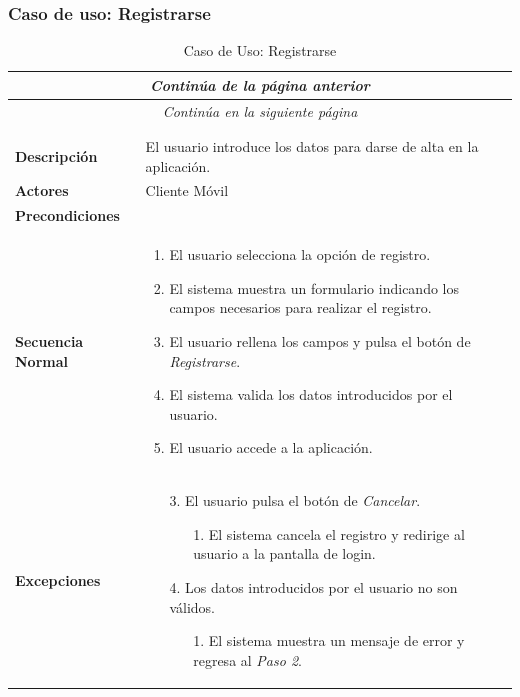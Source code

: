 \newpage
\subsubsection*{Caso de uso: Registrarse}
\begin{longtable}{| p{4cm} | p{10cm} |}
\endfirsthead
\multicolumn{2}{c}{\textit{Continúa de la página anterior}}\\[12pt]
\hline
\endhead
\hline
\multicolumn{2}{c}{\textit{Continúa en la siguiente página}} \\
\endfoot
\hline
\caption{Caso de Uso: Registrarse}\label{fig:1}\\
\endlastfoot


\hline
\multicolumn{2}{|c|}{\textbf{CU$<$02$>$ - Registrarse}} \\

\hline
\textbf{Descripción} &
El usuario introduce los datos para darse de alta en la aplicación. \\

\hline
\textbf{Actores} &
Cliente Móvil\\


\hline
\textbf{Precondiciones} &
\\

\hline
\textbf{Secuencia Normal} &\mbox{}\par\vspace{-\baselineskip}
\begin{enumerate}[leftmargin=0.7cm, topsep=0.1cm]
\item El usuario selecciona la opción de registro.
\item El sistema muestra un formulario indicando los campos necesarios para realizar el registro.
\item El usuario rellena los campos y pulsa el botón de \textit{Registrarse}.
\item El sistema valida los datos introducidos por el usuario.
\item El usuario accede a la aplicación.
\end{enumerate}\\

\hline
\textbf{Excepciones} &\mbox{}\par\vspace{-\baselineskip}
\begin{enumerate}[leftmargin=0.9cm, topsep=0.1cm]
\item[3.] El usuario pulsa el botón de \textit{Cancelar}.
	\begin{itemize}
	\item[1.] El sistema cancela el registro y redirige al usuario a la pantalla de login.
	\end{itemize}
\item[4.] Los datos introducidos por el usuario no son válidos.
	\begin{itemize}
	\item[1.] El sistema muestra un mensaje de error y regresa al \textit{Paso 2}.
	\end{itemize}
\end{enumerate}\\


\end{longtable}
